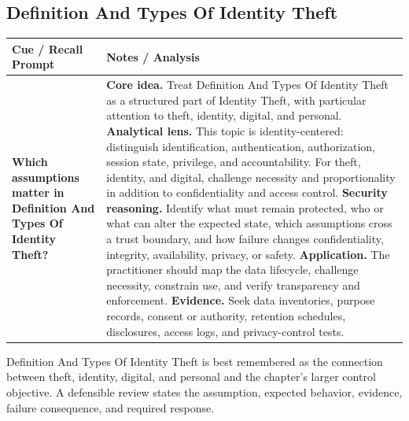 \documentclass[11pt]{article}
\newcommand{\CornellHeader}{%
\rowcolor{Navy}\color{white}\bfseries Cue / Recall Prompt & \color{white}\bfseries Notes / Analysis\\\hline}
\newcommand{\CornellRow}[2]{%
\cellcolor{CueGray}\RaggedRight\textbf{#1} & \RaggedRight #2\\\hline}
\begin{document}
\subsection*{Definition And Types Of Identity Theft}
\begin{longtable}{>{\RaggedRight\arraybackslash}p{}|>{\RaggedRight\arraybackslash}p{}}
\CornellHeader
\CornellRow{Which assumptions matter in Definition And Types Of Identity Theft?}{\textbf{Core idea.} Treat Definition And Types Of Identity Theft as a structured part of Identity Theft, with particular attention to theft, identity, digital, and personal. \textbf{Analytical lens.} This topic is identity-centered: distinguish identification, authentication, authorization, session state, privilege, and accountability. For theft, identity, and digital, challenge necessity and proportionality in addition to confidentiality and access control. \textbf{Security reasoning.} Identify what must remain protected, who or what can alter the expected state, which assumptions cross a trust boundary, and how failure changes confidentiality, integrity, availability, privacy, or safety. \textbf{Application.} The practitioner should map the data lifecycle, challenge necessity, constrain use, and verify transparency and enforcement. \textbf{Evidence.} Seek data inventories, purpose records, consent or authority, retention schedules, disclosures, access logs, and privacy-control tests.}
\end{longtable}
\begin{topicsummary}
Definition And Types Of Identity Theft is best remembered as the connection between theft, identity, digital, and personal and the chapter's larger control objective. A defensible review states the assumption, expected behavior, evidence, failure consequence, and required response.
\end{topicsummary}
\end{document}
